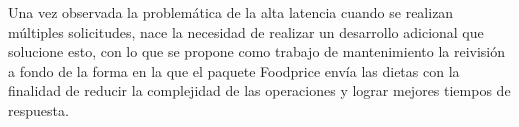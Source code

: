 \noindent Una vez observada la problem\'atica de la alta latencia cuando se realizan m\'ultiples solicitudes, nace la necesidad de realizar un desarrollo adicional que solucione esto, con lo que se propone como trabajo de mantenimiento la reivisi\'on a fondo de la forma en la que el paquete Foodprice env\'ia las dietas con la finalidad de reducir la complejidad de las operaciones y lograr mejores tiempos de respuesta.